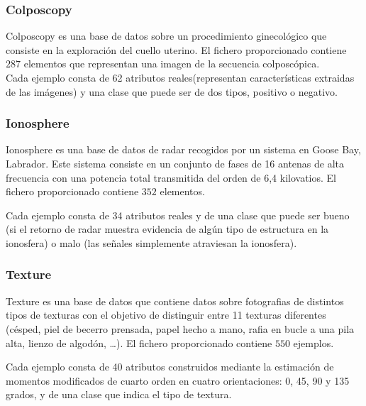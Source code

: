 \documentclass[size=a4, parskip=half, titlepage=false, toc=flat, toc=bib, 12pt]{scrartcl}
\begin{document}
\subsubsection{Colposcopy}
Colposcopy es una base de datos sobre un procedimiento ginecológico que consiste en la exploración del cuello uterino. El fichero proporcionado contiene $287$ elementos que representan una imagen de la secuencia colposcópica.\\

Cada ejemplo consta de 62 atributos reales(representan características extraidas de las imágenes) y una clase que puede ser de dos tipos, positivo o negativo.

\subsubsection{Ionosphere}
Ionosphere es una base de datos de radar recogidos por un sistema en Goose Bay, Labrador. Este sistema consiste en un conjunto de fases de 16 antenas de alta frecuencia con una potencia total transmitida del orden de 6,4 kilovatios. El fichero proporcionado contiene $352$ elementos.

Cada ejemplo consta de 34 atributos reales y de una clase que puede ser bueno (si el retorno de radar muestra evidencia de algún tipo de estructura en la ionosfera) o malo (las señales simplemente atraviesan la ionosfera).

\subsubsection{Texture}
Texture es una base de datos que contiene datos sobre fotografias de distintos tipos de texturas con el objetivo de distinguir entre 11 texturas diferentes (césped, piel de becerro prensada, papel hecho a mano, rafia en bucle a una pila alta, lienzo de algodón, \dots). El fichero proporcionado contiene $550$ ejemplos.

Cada ejemplo consta de 40 atributos construidos mediante la estimación de momentos modificados de cuarto orden en cuatro orientaciones: 0, 45, 90 y 135 grados, y de una clase que indica el tipo de textura.
\end{document}
